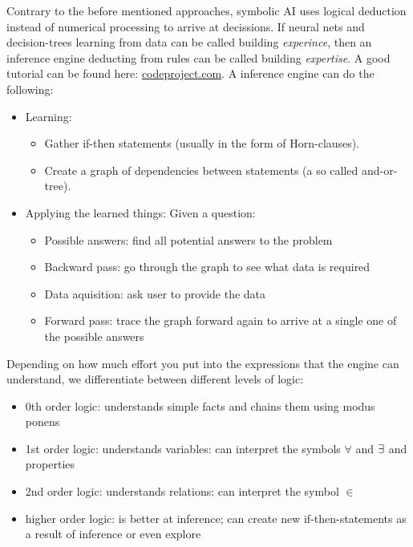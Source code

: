 Contrary to the before mentioned approaches, symbolic AI uses logical deduction instead of numerical processing to arrive at decissions. If neural nets and decision-trees learning from data can be called building \emph{experince}, then an inference engine deducting from rules can be called building \emph{expertise}. A good tutorial can be found here: \href{codeproject.com/Articles/179375/Man-Marriage-and-Machine-Adventures-in-Artificia}{codeproject.com}.
A inference engine can do the following: 
\begin{itemize}
	\item Learning: 
		\begin{itemize}
			\item Gather if-then statements (usually in the form of Horn-clauses).
			\item Create a graph of dependencies between statements (a so called and-or-tree).
		\end{itemize}
	\item Applying the learned things: Given a question: 
		\begin{itemize}
			\item Possible answers: find all potential answers to the problem
			\item Backward pass: go through the graph to see what data is required
			\item Data aquisition: ask user to provide the data
			\item Forward pass: trace the graph forward again to arrive at a single one of the possible answers
		\end{itemize}
\end{itemize}

Depending on how much effort you put into the expressions that the engine can understand, we differentiate between different levels of logic: 
\begin{itemize}
    \item 0th order logic: understands simple facts and chains them using modus ponens
    \item 1st order logic: understands variables: can interpret the symbols $\forall$ and $\exists$ and properties
    \item 2nd order logic: understands relations: can interpret the symbol $\in$ 
    \item higher order logic: is better at inference; can create new if-then-statements as a result of inference or even explore
\end{itemize}
